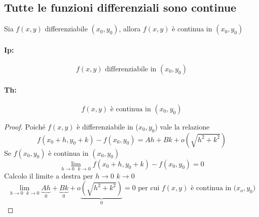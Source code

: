 \documentclass{book}
\begin{document}
\subsection{Tutte le funzioni differenziali sono continue}
Sia $f(x,y)$ differenziabile $(x_0,y_0)$, allora $f(x,y)$ è continua in $(x_0,y_0)$
\begin{multicols}{2}
  \paragraph{Ip:}
  \begin{equation*}
    f(x,y) \text{ differenziabile in } (x_0,y_0)
  \end{equation*}
  \paragraph{Th:}
  \begin{equation*}
    f(x,y) \text{ è continua in } (x_0,y_0)
  \end{equation*}
\end{multicols}
\begin{proof}
  Poiché $f(x,y)$ è differenziabile in ($x_0,y_0$) vale la relazione
  \begin{equation*}
    f(x_0+h,y_0+k) - f(x_0,y_0)=Ah+Bk+o(\sqrt{h^2+k^2})
  \end{equation*}
  Se $f(x_0,y_0)$ è continua in $(x_0,y_0)$
  \begin{equation*}
    \lim_{h\to 0\text{ } k\to 0}f(x_0+h,y_0+k) - f(x_0,y_0)=0
  \end{equation*}
  Calcolo il limite a destra per $h\to 0$ $k\to 0$
  \begin{equation*}
    \lim_{h\to 0\text{ } k\to 0}\underbrace{Ah}_0+\underbrace{Bk}_0+o\underbrace{(\sqrt{h^2+k^2})}_0=0 \text{ per cui $f(x,y)$ è continua in ($x_o,y_0$)}
  \end{equation*} 
\end{proof}
\end{document}
